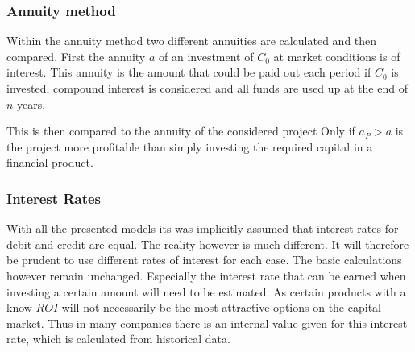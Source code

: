         \subsubsection{Annuity method}
            Within the annuity method two different annuities are calculated and then compared. First the annuity $a$
            of an investment of $C_0$ at market conditions is of interest.
            This annuity is the amount that could be paid out each period if $C_0$ is invested, compound interest
            is considered and all funds are used up at the end of $n$ years.

            This is then compared to the annuity of the considered project
            Only if $a_P > a$ is the project more profitable than simply investing the required capital in a
            financial product.

        \subsubsection{Interest Rates}
            With all the presented models its was implicitly assumed that interest rates for debit and credit are
            equal. The reality however is much different. It will therefore be prudent to use different rates of interest
            for each case. The basic calculations however remain unchanged. Especially the interest rate that can be
            earned when investing a certain amount will need to be estimated. As certain products with a know $ROI$
            will not necessarily be the most attractive options on the capital market. Thus in many companies
            there is an internal value given for this interest rate, which is calculated from historical data.

